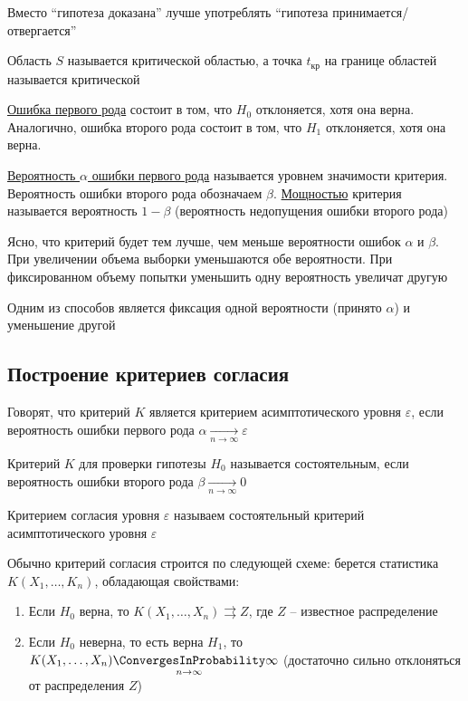 Вместо \enquote{гипотеза доказана} лучше употреблять \enquote{гипотеза принимается/отвергается}

Область $S$ называется критической областью, а точка $t_\text{кр}$ на границе областей называется критической

\Def \underline{Ошибка первого рода} состоит в том, что $H_0$ отклоняется, хотя она верна. 
Аналогично, ошибка второго рода состоит в том, что $H_1$ отклоняется, хотя она верна.

\Defs \underline{Вероятность $\alpha$ ошибки первого рода} называется уровнем значимости критерия. 
Вероятность ошибки второго рода обозначаем $\beta$. \underline{Мощностью} критерия называется вероятность $1 - \beta$ (вероятность
недопущения ошибки второго рода)

Ясно, что критерий будет тем лучше, чем меньше вероятности ошибок $\alpha$ и $\beta$. При увеличении объема
выборки уменьшаются обе вероятности. При фиксированном объему попытки уменьшить одну вероятность
увеличат другую

Одним из способов является фиксация одной вероятности (принято $\alpha$) и уменьшение другой

\subsection{Построение критериев согласия}

\Def Говорят, что критерий $K$ является критерием асимптотического уровня $\varepsilon$, если 
вероятность ошибки первого рода $\alpha \underset{n \to \infty}{\longrightarrow} \varepsilon$

\Defs Критерий $K$ для проверки гипотезы $H_0$ называется состоятельным, если вероятность ошибки второго рода
$\beta \underset{n \to \infty}{\longrightarrow} 0$

\Defs Критерием согласия уровня $\varepsilon$ называем состоятельный критерий асимптотического уровня
$\varepsilon$

Обычно критерий согласия строится по следующей схеме: берется статистика $K(X_1, \dots, K_n)$, 
обладающая свойствами:

\begin{enumerate}
    \item Если $H_0$ верна, то $K(X_1, \dots, X_n) \rightrightarrows Z$, где $Z$ -- известное распределение

    \item Если $H_0$ неверна, то есть верна $H_1$, то $K(X_1, \dots, X_n) \underset{n \to \infty}{\ConvergesInProbability} \infty$ 
    (достаточно сильно отклоняться от распределения $Z$)
\end{enumerate}

